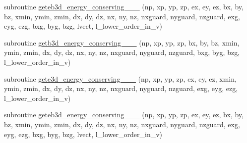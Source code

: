 \begin{DoxyCompactItemize}
\item 
subroutine \hyperlink{field__gathering_8_f90_ad43c0d4f9417aa987d3ca7f033ef6e69}{geteb3d\+\_\+energy\+\_\+conserving\+\_\+\_\+\_} (np, xp, yp, zp, ex, ey, ez, bx, by, bz, xmin, ymin, zmin,                                                                                                                                                           dx, dy, dz, nx, ny, nz, nxguard, nyguard, nzguard,                                                                                                                                                   exg, eyg, ezg, bxg, byg, bzg, lvect, l\+\_\+lower\+\_\+order\+\_\+in\+\_\+v)
\item 
subroutine \hyperlink{field__gathering_8_f90_aaa9c36b2c9467ccd77152e8a92ecfabe}{getb3d\+\_\+energy\+\_\+conserving\+\_\+\_\+\_} (np, xp, yp, zp, bx, by, bz, xmin, ymin, zmin,                                                                                                                                                                           dx, dy, dz, nx, ny, nz, nxguard, nyguard, nzguard,                                                                                                                                                   bxg, byg, bzg, l\+\_\+lower\+\_\+order\+\_\+in\+\_\+v)
\item 
subroutine \hyperlink{field__gathering_8_f90_a4bc4ddba4b00ad2b51022fd9ce43c128}{gete3d\+\_\+energy\+\_\+conserving\+\_\+\_\+\_} (np, xp, yp, zp, ex, ey, ez, xmin, ymin, zmin,                                                                                                                                                                           dx, dy, dz, nx, ny, nz, nxguard, nyguard, nzguard,                                                                                                                                                   exg, eyg, ezg, l\+\_\+lower\+\_\+order\+\_\+in\+\_\+v)
\item 
subroutine \hyperlink{field__gathering_8_f90_a97bcf4daf98fbda5e03bdd9288025841}{geteb3d\+\_\+energy\+\_\+conserving\+\_\+\_\+\_} (np, xp, yp, zp, ex, ey, ez, bx, by, bz, xmin, ymin, zmin,                                                                                                                                                           dx, dy, dz, nx, ny, nz, nxguard, nyguard, nzguard,                                                                                                                                                   exg, eyg, ezg, bxg, byg, bzg, lvect, l\+\_\+lower\+\_\+order\+\_\+in\+\_\+v)

\end{DoxyCompactItemize}

